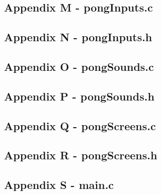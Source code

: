 \documentclass[a4paper,12pt]{article}
\begin{document}
\subsection{Appendix M - pongInputs.c}

\newpage
\subsection{Appendix N - pongInputs.h}

\newpage
\subsection{Appendix O - pongSounds.c}

\newpage
\subsection{Appendix P - pongSounds.h}

\newpage
\subsection{Appendix Q - pongScreens.c}

\newpage
\subsection{Appendix R - pongScreens.h}

\newpage
\subsection{Appendix S - main.c}

\newpage
{}
\begin{flushleft}

\end{flushleft}
\end{document}
